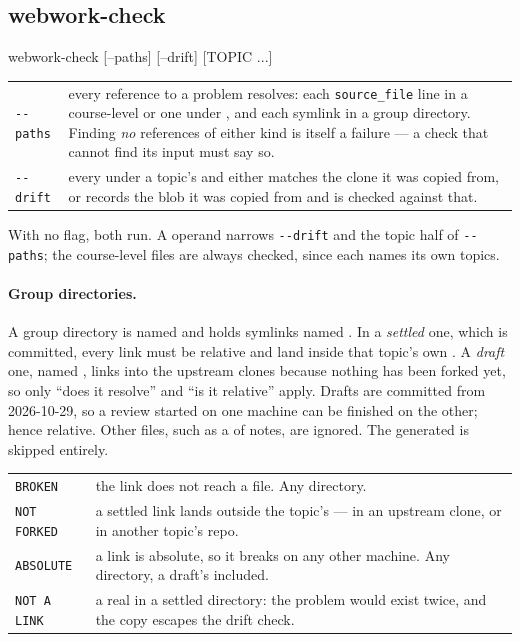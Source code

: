 \subsection*{webwork-check}

\begin{manexsource}
webwork-check [--paths] [--drift] [TOPIC ...]
\end{manexsource}

\begin{center}
\begin{tabularx}{\linewidth}{@{}l Y@{}}
\texttt{-{}-paths} & every reference to a problem resolves: each
  \texttt{source\_file} line in a course-level  or one under
  , and each symlink in a group directory. Finding
  \emph{no} references of either kind is itself a failure --- a check that
  cannot find its input must say so.\\
\texttt{-{}-drift} & every  under a topic's 
  and  either matches the clone it was copied from, or
  records the blob it was copied from and is checked against that.\\
\end{tabularx}
\end{center}

With no flag, both run.
A  operand narrows \texttt{-{}-drift} and the topic half of \texttt{-{}-paths}; the course-level  files are always checked, since each names its own topics.

\paragraph{Group directories.}
A group directory is named  and holds symlinks named .
In a \emph{settled} one, which is committed, every link must be relative and land inside that topic's own .
A \emph{draft} one, named , links into the upstream clones because nothing has been forked yet, so only ``does it resolve'' and ``is it relative'' apply.
Drafts are committed from 2026-10-29, so a review started on one machine can be finished on the other; hence relative.
Other files, such as a  of notes, are ignored.
The generated  is skipped entirely.

\begin{center}
\begin{tabularx}{\linewidth}{@{}l Y@{}}
\texttt{BROKEN} & the link does not reach a file. Any directory.\\
\texttt{NOT FORKED} & a settled link lands outside the topic's
   --- in an upstream clone, or in another topic's repo.\\
\texttt{ABSOLUTE} & a link is absolute, so it breaks on any other machine.
  Any directory, a draft's included.\\
\texttt{NOT A LINK} & a real  in a settled directory: the problem
  would exist twice, and the copy escapes the drift check.\\
\end{tabularx}
\end{center}

